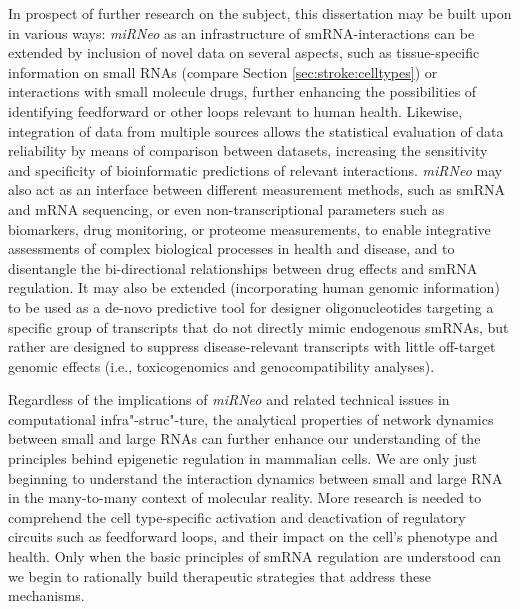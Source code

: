 \newpage

In prospect of further research on the subject, this dissertation may be built upon in various ways: \emph{miRNeo} as an infrastructure of smRNA-interactions can be extended by inclusion of novel data on several aspects, such as tissue-specific information on small RNAs (compare Section \ref{sec:stroke:celltypes}) or interactions with small molecule drugs, further enhancing the possibilities of identifying feedforward or other loops relevant to human health. Likewise, integration of data from multiple sources allows the statistical evaluation of data reliability by means of comparison between datasets, increasing the sensitivity and specificity of bioinformatic predictions of relevant interactions. \emph{miRNeo} may also act as an interface between different measurement methods, such as smRNA and mRNA sequencing, or even non-transcriptional parameters such as biomarkers, drug monitoring, or proteome measurements, to enable integrative assessments of complex biological processes in health and disease, and to disentangle the bi-directional relationships between drug effects and smRNA regulation. It may also be extended (incorporating human genomic information) to be used as a de-novo predictive tool for designer oligonucleotides targeting a specific group of transcripts that do not directly mimic endogenous smRNAs, but rather are designed to suppress disease-relevant transcripts with little off-target genomic effects (i.e., toxicogenomics and genocompatibility analyses).

Regardless of the implications of \emph{miRNeo} and related technical issues in computational infra"-struc"-ture, the analytical properties of network dynamics between small and large RNAs can further enhance our understanding of the principles behind epigenetic regulation in mammalian cells. We are only just beginning to understand the interaction dynamics between small and large RNA in the many-to-many context of molecular reality. More research is needed to comprehend the cell type-specific activation and deactivation of regulatory circuits such as feedforward loops, and their impact on the cell's phenotype and health. Only when the basic principles of smRNA regulation are understood can we begin to rationally build therapeutic strategies that address these mechanisms. 